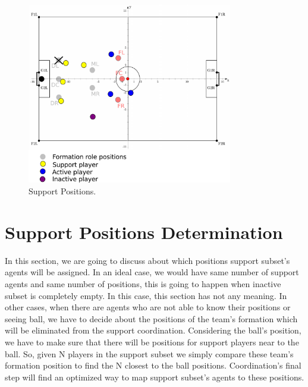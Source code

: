 \begin{figure}[t!]
\centering
  \includegraphics[width=0.8\textwidth]{Chapter4/figures/SupportPos.pdf}
  \caption{Support Positions.} 
  \label{fig:SupportPos}
\end{figure}

\section{Support Positions Determination}
In this section, we are going to discuss about which positions support subset's agents will be assigned. In an ideal case, we would have same number of support agents and same number of positions, this is going to happen when inactive subset is completely empty. In this case, this section has not any meaning. In other cases, when there are agents who are not able to know their positions or seeing ball, we have to decide about the positions of the team's formation which will be eliminated from the support coordination. Considering the ball's position, we have to make sure that there will be positions for support players near to the ball. So, given N players in the support subset we simply compare these team's formation position to find the N closest to the ball positions. Coordination's final step will find an optimized way to map support subset's agents to these positions.




